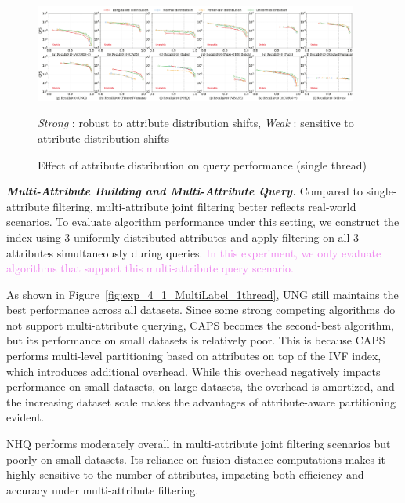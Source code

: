 \documentclass[sigconf, nonacm]{acmart}
\begin{document}
	\begin{figure}
		\centering
		
		\includegraphics[width=0.95\textwidth]{figures/exp/exp_3_1.pdf}
		\caption{Effect of attribute distribution on query performance (single thread)}
		\label{fig:exp_3_1}
		
		\footnotesize{
		\begin{center}
			\begin{minipage}{\linewidth}
				\centering	
				\textit{Strong} : robust to attribute distribution shifts,  \textit{Weak} : sensitive to attribute distribution shifts
			\end{minipage}
		\end{center}
		}
	\end{figure}
	
	
	
	
	
	\textit{\textbf{Multi-Attribute Building and Multi-Attribute Query.}}  
	Compared to single-attribute filtering, multi-attribute joint filtering better reflects real-world scenarios. To evaluate algorithm performance under this setting, we construct the index using 3 uniformly distributed attributes and apply filtering on all 3 attributes simultaneously during queries. \textcolor{violet}{In this experiment, we only evaluate algorithms that support this multi-attribute query scenario.}
	
	As shown in Figure~\ref{fig:exp_4_1_MultiLabel_1thread}, UNG still maintains the best performance across all datasets. Since some strong competing algorithms do not support multi-attribute querying, CAPS becomes the second-best algorithm, but its performance on small datasets is relatively poor. This is because CAPS performs multi-level partitioning based on attributes on top of the IVF index, which introduces additional overhead. While this overhead negatively impacts performance on small datasets, on large datasets, the overhead is amortized, and the increasing dataset scale makes the advantages of attribute-aware partitioning evident.
	
	NHQ performs moderately overall in multi-attribute joint filtering scenarios but poorly on small datasets. Its reliance on fusion distance computations makes it highly sensitive to the number of attributes, impacting both efficiency and accuracy under multi-attribute filtering.
	
\end{document}
